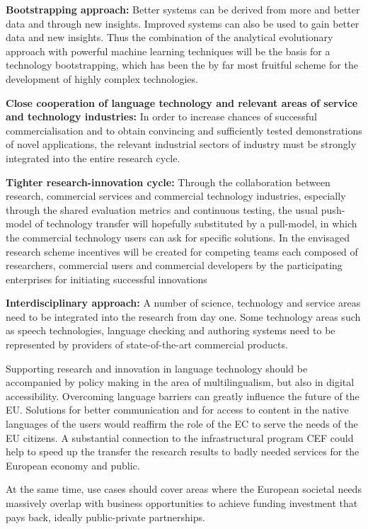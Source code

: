 \documentclass[10pt, plain]{../../metanetpaper}
\begin{document}
\begin{multicols}{2}
\textbf{Bootstrapping approach:} Better systems can be derived from more and better data and through new insights. Improved systems can also be used to gain better data and new insights. Thus the combination of the analytical evolutionary approach with powerful machine learning techniques will be the basis for a technology bootstrapping, which has been the by far most fruitful scheme for the development of highly complex technologies.

\textbf{Close cooperation of language technology and relevant areas of service and technology industries:} In order to increase chances of successful commercialisation and to obtain convincing and sufficiently tested demonstrations of novel applications, the relevant industrial sectors of industry must be strongly integrated into the entire research cycle.

\textbf{Tighter research-innovation cycle:} Through the collaboration between research, commercial services and commercial technology industries, especially through the shared evaluation metrics and continuous testing, the usual push-model of technology transfer will hopefully substituted by a pull-model, in which the commercial technology users can ask for specific solutions. In the envisaged research scheme incentives will be created for competing teams each composed of researchers, commercial users and commercial developers by the participating enterprises for initiating successful innovations

\textbf{Interdisciplinary approach:} A number of science, technology and service areas need to be integrated into the research from day one. Some technology areas such as speech technologies, language checking and authoring systems need to be represented by providers of state-of-the-art commercial products.

Supporting research and innovation in language technology should be accompanied by policy making in the area of multilingualism, but also in digital accessibility. Overcoming language barriers can greatly influence the future of the EU. Solutions for better communication and for access to content in the native languages of the users would reaffirm the role of the EC to serve the needs of the EU citizens. A substantial connection to the infrastructural program CEF could help to speed up the transfer the research results to badly needed services for the European economy and public.
 
At the same time, use cases should cover areas where the European societal needs massively overlap with business opportunities to achieve funding investment that pays back, ideally public-private partnerships.
 

\end{multicols}
\end{document}
